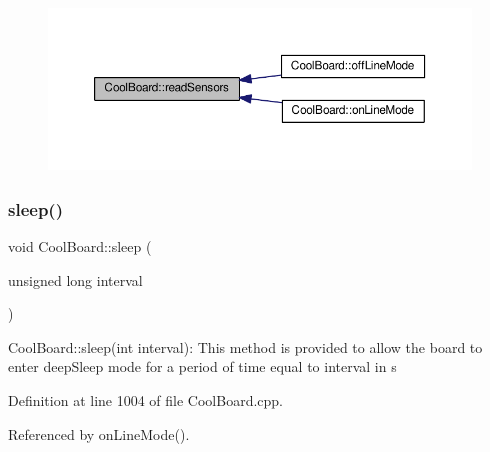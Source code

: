\begin{figure}[H]
\begin{center}
\leavevmode
\includegraphics[width=350pt]{classCoolBoard_ad03abdce2e65f520bbf2cff0f2d083cf_icgraph}
\end{center}
\end{figure}
\mbox{\label{classCoolBoard_a069952cdcb2e7f68518aa429eceadb6e}} 
\subsubsection{\texorpdfstring{sleep()}{sleep()}}
{\footnotesize\ttfamily void Cool\+Board\+::sleep (\begin{DoxyParamCaption}\item[{unsigned long}]{interval }\end{DoxyParamCaption})}

Cool\+Board\+::sleep(int interval)\+: This method is provided to allow the board to enter deep\+Sleep mode for a period of time equal to interval in s 

Definition at line 1004 of file Cool\+Board.\+cpp.



Referenced by on\+Line\+Mode().


